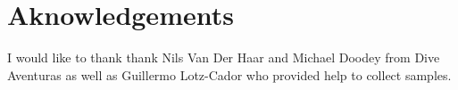 \documentclass[fleqn,10pt,lineno]{wlpeerj} %
\begin{document}
\section{Aknowledgements}\label{aknowledgements}

I would like to thank thank Nils Van Der Haar and Michael Doodey from
Dive Aventuras as well as Guillermo Lotz-Cador who provided help to
collect samples.


\end{document}
